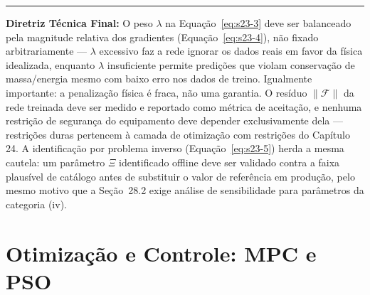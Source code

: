 \documentclass[12pt,a4paper]{article}
\numberwithin{equation}{section}
\numberwithin{table}{section}
\numberwithin{figure}{section}
\begin{document}
{	\vspace{1em}
	\hrule
	\vspace{1em}

	\textbf{Diretriz Técnica Final:} O peso $\lambda$ na Equação~\eqref{eq:s23-3} deve ser balanceado pela magnitude relativa dos gradientes (Equação~\eqref{eq:s23-4}), não fixado arbitrariamente — $\lambda$ excessivo faz a rede ignorar os dados reais em favor da física idealizada, enquanto $\lambda$ insuficiente permite predições que violam conservação de massa/energia mesmo com baixo erro nos dados de treino. Igualmente importante: a penalização física é fraca, não uma garantia. O resíduo $\| \mathcal{F} \|$ da rede treinada deve ser medido e reportado como métrica de aceitação, e nenhuma restrição de segurança do equipamento deve depender exclusivamente dela — restrições duras pertencem à camada de otimização com restrições do Capítulo 24. A identificação por problema inverso (Equação~\eqref{eq:s23-5}) herda a mesma cautela: um parâmetro $\Xi$ identificado offline deve ser validado contra a faixa plausível de catálogo antes de substituir o valor de referência em produção, pelo mesmo motivo que a Seção~28.2 exige análise de sensibilidade para parâmetros da categoria (iv).

	\clearpage
	\section{Otimização e Controle: MPC e PSO}

}
\end{document}
